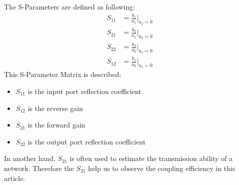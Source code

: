 The S-Parameters are defined as following:
\begin{align}
S_{11}&=\frac{b_{1}}{a_{1}}|_{a_{2}=0}\\
S_{21}&=\frac{b_{2}}{a_{1}}|_{a_{2}=0}\\
S_{22}&=\frac{b_{2}}{a_{2}}|_{a_{1}=0}\\
S_{12}&=\frac{b_{1}}{a_{2}}|_{a_{1}=0}
\end{align}
This S-Parameter Matrix is described:
\begin{itemize}
\item $S_{11}$ is the input port reflection coefficient
\item $S_{12}$ is the reverse gain
\item $S_{21}$ is the forward gain
\item $S_{22}$ is the output port reflection coefficient
\end{itemize}
In another hand, $S_{21}$ is often used to estimate the transmission ability of a network. Therefore the $S_{21}$ help us to observe the coupling efficiency in this article.
